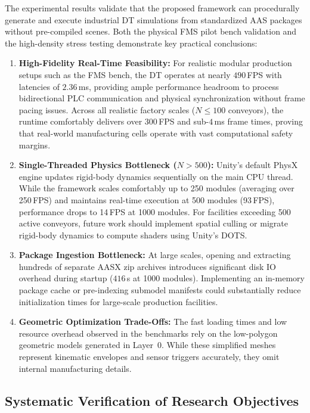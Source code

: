 The experimental results validate that the proposed framework can procedurally generate and execute industrial \gls{DT} simulations from standardized \gls{AAS} packages without pre-compiled scenes. Both the physical \gls{FMS} pilot bench validation and the high-density stress testing demonstrate key practical conclusions:

\begin{enumerate}
    \item \textbf{High-Fidelity Real-Time Feasibility:} For realistic modular production setups such as the \gls{FMS} bench, the \gls{DT} operates at nearly $490\,$\gls{FPS} with latencies of $2.36\,$ms, providing ample performance headroom to process bidirectional \gls{PLC} communication and physical synchronization without frame pacing issues. Across all realistic factory scales ($N \le 100$ conveyors), the runtime comfortably delivers over $300\,$\gls{FPS} and sub-$4\,$ms frame times, proving that real-world manufacturing cells operate with vast computational safety margins.
    \item \textbf{Single-Threaded Physics Bottleneck ($N > 500$):} Unity's default PhysX engine updates rigid-body dynamics sequentially on the main \gls{CPU} thread. While the framework scales comfortably up to 250 modules (averaging over 250\,\gls{FPS}) and maintains real-time execution at 500 modules (93\,\gls{FPS}), performance drops to 14\,\gls{FPS} at 1000 modules. For facilities exceeding 500 active conveyors, future work should implement spatial culling or migrate rigid-body dynamics to compute shaders using Unity's \gls{DOTS}.
    \item \textbf{Package Ingestion Bottleneck:} At large scales, opening and extracting hundreds of separate \gls{AASX} zip archives introduces significant disk \gls{IO} overhead during startup ($416\,$s at 1000 modules). Implementing an in-memory package cache or pre-indexing submodel manifests could substantially reduce initialization times for large-scale production facilities.
    \item \textbf{Geometric Optimization Trade-Offs:} The fast loading times and low resource overhead observed in the benchmarks rely on the low-polygon geometric models generated in Layer~0. While these simplified meshes represent kinematic envelopes and sensor triggers accurately, they omit internal manufacturing details.
\end{enumerate}

\subsection{Systematic Verification of Research Objectives}

